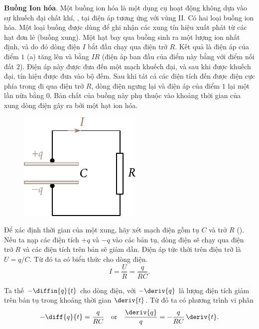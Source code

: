 \textbf{Buồng Ion hóa}. Một buồng ion hóa là một dụng cụ hoạt động không dựa vào sự khuếch đại chất khí, \ie, tại điện áp tương ứng với vùng II.
Có hai loại buồng ion hóa.
Một loại buồng được dùng để ghi nhận các xung tín hiệu xuất phát từ các hạt đơn lẻ (buồng xung).
Một hạt bay qua buồng sinh ra một lượng ion nhất định, và do đó dòng điện $I$ bắt đầu chạy qua điện trở $R$.
Kết quả là điện áp của điểm $1$ (a) tăng lên và bằng $IR$ (điện áp ban đầu của điểm này bằng với điểm nối đất $2$).
Điện áp này được đưa đến một mạch khuếch đại, và sau khi được khuếch đại, tín hiệu được đưa vào bộ đếm.
Sau khi tát cả các điện tích đến được điện cực phía trong đi qua điện trở $R$, dòng điện ngưng lại và điện áp của điểm $1$ lại một lần nữa bằng 0.
Bản chất của buồng này phụ thuộc vào khoảng thời gian của xung dòng điện gây ra bởi một hạt ion hóa.

\begin{figure}[t]
	\begin{center}
		\includegraphics[scale=1]{figures/ch_12/fig_12_5.pdf}
		\caption[]{}
		\label{fig:12_5}
	\end{center}
	\vspace{-0.8cm}
\end{figure}

Để xác định thời gian của một xung, hãy xét mạch điện gồm tụ $C$ và trở $R$ ().
Nếu ta nạp các điện tích $+q$ và $-q$ vào các bản tụ, dòng điện sẽ chạy qua điện trở $R$ và các điện tích trên bản sẽ giảm dần.
Điện áp tức thời trên điện trở là $U = q/C$.
Từ đó ta có biểu thức cho dòng điện.
\begin{equation}\label{eq:12_9}
    I = \frac{U}{R} = \frac{q}{RC}.
\end{equation}

\noindent
Ta thế $-\diffin{q}{t}$ cho dòng điện, với $-\deriv{q}$ là lượng điện tích giảm trên bản tụ trong khoảng thời gian $\deriv{t}$.
Từ đó ta có phương trình vi phân
\begin{equation*}
    -\diff{q}{t} = \frac{q}{RC}\quad \text{or} \quad \frac{\deriv{q}}{q} = -\frac{q}{RC}\, \deriv{t}.
\end{equation*}

